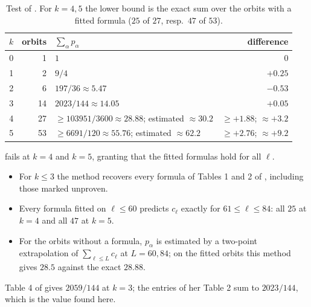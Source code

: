 \documentclass[10pt]{article}
\begin{document}
\begin{table}[H]
	\centering
	\begin{tabular}{r|r|l|r}
		\toprule
		$k$ & orbits & $\sum_\alpha p_\alpha$ & difference \\
		\midrule
		0 & 1 & $1$ & $0$ \\
		1 & 2 & $9/4$ & $+0.25$ \\
		2 & 6 & $197/36 \approx 5.47$ & $-0.53$ \\
		3 & 14 & $2023/144 \approx 14.05$ & $+0.05$ \\
		4 & 27 & $\geq 103951/3600 \approx 28.88$; estimated $\approx 30.2$ & $\geq +1.88$; $\approx +3.2$ \\
		5 & 53 & $\geq 6691/120 \approx 55.76$; estimated $\approx 62.2$ & $\geq +2.76$; $\approx +9.2$ \\
		\bottomrule
	\end{tabular}
	\caption{Test of . For $k = 4, 5$ the lower bound is the exact sum over the orbits with a fitted formula ($25$ of $27$, resp.\ $47$ of $53$).}
\end{table}

\begin{claim}
	 fails at $k = 4$ and $k = 5$, granting that the fitted formulas hold for all $\ell$.
\end{claim}

\begin{rmk}[evidence]
	\begin{itemize}
		\item For $k \leq 3$ the method recovers every formula of Tables 1 and 2 of \citet{chas16}, including those marked unproven.
		\item Every formula fitted on $\ell \leq 60$ predicts $c_\ell$ exactly for $61 \leq \ell \leq 84$: all $25$ at $k = 4$ and all $47$ at $k = 5$.
		\item For the orbits without a formula, $p_\alpha$ is estimated by a two-point extrapolation of $\sum_{\ell \leq L} c_\ell$ at $L = 60, 84$; on the fitted orbits this method gives $28.5$ against the exact $28.88$.
	\end{itemize}
\end{rmk}

\begin{rmk}
	Table 4 of \citet{chas16} gives $2059/144$ at $k = 3$; the entries of her Table 2 sum to $2023/144$, which is the value found here.
\end{rmk}
\end{document}
